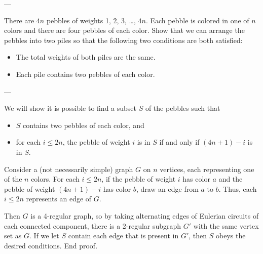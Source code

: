 
---

There are $4n$ pebbles of weights 1, 2, 3, \ldots, $4n$. Each pebble is colored in one of $n$ colors and there are four pebbles of each color. Show that we can arrange the pebbles into two piles so that the following two conditions are both satisfied:
\begin{itemize}[itemsep=0em]
    \item The total weights of both piles are the same.
    \item Each pile contains two pebbles of each color.
\end{itemize}

---

We will show it is possible to find a subset $S$ of the pebbles such that
\begin{itemize}[itemsep=0em]
    \item $S$ contains two pebbles of each color, and
    \item for each $i\le2n$, the pebble of weight $i$ is in $S$ if and only if $(4n+1)-i$ is in $S$.
\end{itemize}
Consider a (not necessarily simple) graph $G$ on $n$ vertices, each representing one of the $n$ colors. For each $i\le2n$, if the pebble of weight $i$ has color $a$ and the pebble of weight $(4n+1)-i$ has color $b$, draw an edge from $a$ to $b$. Thus, each $i\le2n$ represents an edge of $G$.

Then $G$ is a 4-regular graph, so by taking alternating edges of Eulerian circuits of each connected component, there is a 2-regular subgraph $G'$ with the same vertex set as $G$. If we let $S$ contain each edge that is present in $G'$, then $S$ obeys the desired conditions. End proof.


